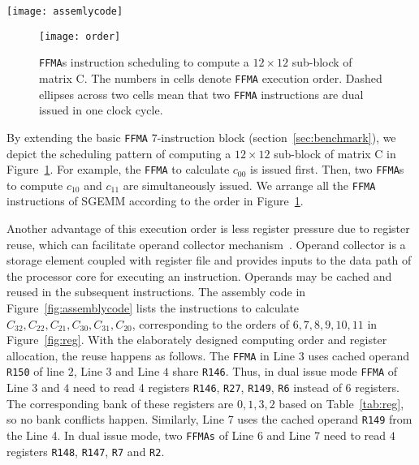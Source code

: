 \begin{figure*}[htbp]
\begin{center}
\texttt{[image: assemlycode]}
    \caption{The comparison of compiler generated codes and our tuned assembly codes.}
\label{fig:assemblycode}
\end{center}
\end{figure*}

\begin{figure}[htbp]
\begin{center}
\texttt{[image: order]}
\caption{{\tt FFMA}s instruction scheduling to compute a $12\times 12$ sub-block of matrix C.  The numbers in
cells denote {\tt FFMA} execution order. Dashed ellipses across two cells mean that two {\tt FFMA} instructions are dual issued in one clock cycle.}
\label{fig:order}
\end{center}
\end{figure}

By extending the basic {\tt FFMA} $7$-instruction block (section~\ref{sec:benchmark}), we depict the scheduling pattern of computing a $12\times 12$ sub-block of matrix C in Figure~\ref{fig:order}.
For example, the {\tt FFMA} to calculate $c_{00}$ is issued first.
Then, two {\tt FFMA}s to
compute $c_{10}$ and $c_{11}$ are simultaneously issued. We arrange all the {\tt FFMA} instructions of SGEMM according to the order in Figure~\ref{fig:order}.

Another advantage of this execution order is less register pressure due to register reuse, which can facilitate
operand collector mechanism~\cite{collector}. Operand collector is a storage element coupled with register file and
provides inputs to the data path of the processor core for executing an instruction.  Operands may be cached and reused
in the subsequent instructions.
The assembly code in Figure~\ref{fig:assemblycode} lists the instructions to calculate $C_{32},C_{22}, C_{21}, C_{30},
C_{31}, C_{20}$, corresponding to the orders of $6,7,8,9,10,11$ in Figure~\ref{fig:reg}.
With the elaborately designed computing order and register allocation, the reuse happens as follows. The {\tt FFMA} in
Line $3$ uses cached operand {\tt R150} of line $2$, Line $3$ and Line $4$ share {\tt R146}. Thus, in dual issue mode
{\tt FFMA} of Line $3$ and $4$ need to read 4 registers {\tt R146}, {\tt R27}, {\tt R149}, {\tt R6} instead of $6$
registers. The corresponding bank of these registers are $0,1,3,2$ based on Table~\ref{tab:reg}, so no bank conflicts happen.
Similarly, Line 7 uses the cached operand {\tt R149} from the Line 4. In dual issue mode, two {\tt FFMAs} of Line 6 and
Line 7 need to read $4$ registers {\tt R148}, {\tt R147}, {\tt R7} and {\tt R2}.

